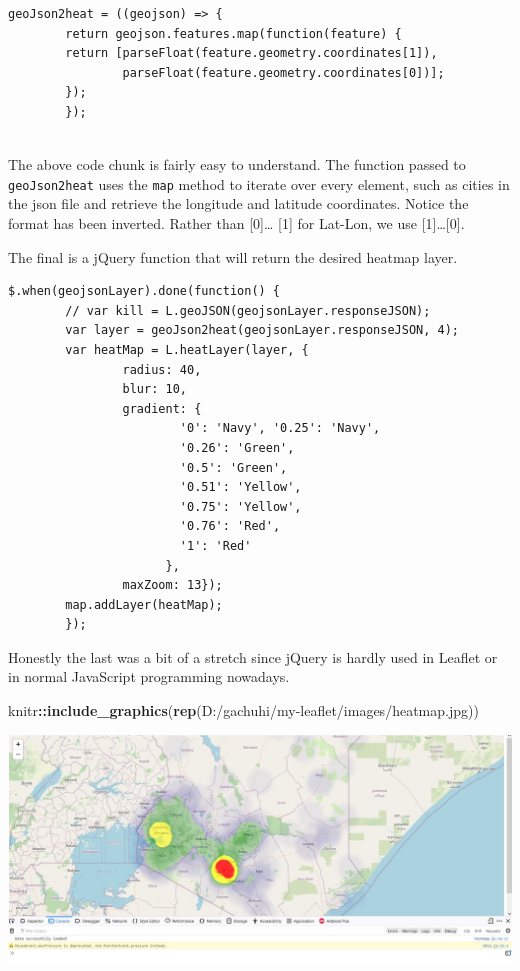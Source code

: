 \documentclass[
]{book}
\newenvironment{Shaded}{\begin{snugshade}}{\end{snugshade}}
\newcommand{\FunctionTok}[1]{\textcolor[rgb]{0.13,0.29,0.53}{\textbf{#1}}}
\newcommand{\NormalTok}[1]{#1}
\newcommand{\SpecialCharTok}[1]{\textcolor[rgb]{0.81,0.36,0.00}{\textbf{#1}}}
\newcommand{\StringTok}[1]{\textcolor[rgb]{0.31,0.60,0.02}{#1}}
\begin{document}
\begin{verbatim}
geoJson2heat = ((geojson) => {
        return geojson.features.map(function(feature) {
        return [parseFloat(feature.geometry.coordinates[1]), 
                parseFloat(feature.geometry.coordinates[0])];
        });
        });
        
\end{verbatim}

The above code chunk is fairly easy to understand. The function passed to \texttt{geoJson2heat} uses the \texttt{map} method to iterate over every element, such as cities in the json file and retrieve the longitude and latitude coordinates. Notice the format has been inverted. Rather than {[}0{]}\ldots{} {[}1{]} for Lat-Lon, we use {[}1{]}\ldots{[}0{]}.

The final is a jQuery function that will return the desired heatmap layer.

\begin{verbatim}
$.when(geojsonLayer).done(function() {
        // var kill = L.geoJSON(geojsonLayer.responseJSON);
        var layer = geoJson2heat(geojsonLayer.responseJSON, 4);
        var heatMap = L.heatLayer(layer, { 
                radius: 40,
                blur: 10, 
                gradient: {
                        '0': 'Navy', '0.25': 'Navy',
                        '0.26': 'Green',
                        '0.5': 'Green',
                        '0.51': 'Yellow',
                        '0.75': 'Yellow',
                        '0.76': 'Red',
                        '1': 'Red'
                      },
                maxZoom: 13});
        map.addLayer(heatMap);
        });
\end{verbatim}

Honestly the last was a bit of a stretch since jQuery is hardly used in Leaflet or in normal JavaScript programming nowadays.

\begin{Shaded}
\begin{Highlighting}[]
\NormalTok{knitr}\SpecialCharTok{::}\FunctionTok{include\_graphics}\NormalTok{(}\FunctionTok{rep}\NormalTok{(}\StringTok{\textquotesingle{}D:/gachuhi/my{-}leaflet/images/heatmap.jpg\textquotesingle{}}\NormalTok{))}
\end{Highlighting}
\end{Shaded}

\includegraphics{../images/heatmap.jpg}
\end{document}
